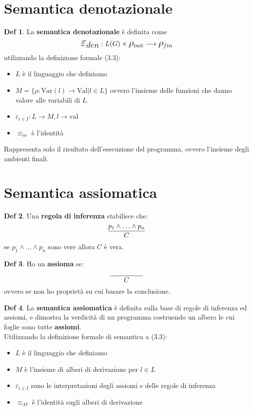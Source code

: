 \documentclass[a4paper]{report}
\theoremstyle{definition} \newtheorem*{defi}{Def}
\theoremstyle{plain} \newtheorem{lemma}{Lemma}
\theoremstyle{plain} \newtheorem{teo}{Teorema}
\theoremstyle{remark} \newtheorem*{es}{Esempio}
\DeclareRobustCommand{\frac}[3][0pt]{%
  {\begingroup\hspace{#1}#2\hspace{#1}\endgroup\over\hspace{#1}#3\hspace{#1}}}
\begin{document}
\section{Semantica denotazionale}
\begin{defi}
	La {\bf semantica denotazionale} è definita come
	$$
	\mathlarger{\mathlarger{\mathlarger{\varepsilon_{den}}}} : L(G) \times \mathlarger{\mathlarger{\rho}}_{init} \longrightarrow \mathlarger{\mathlarger{\rho}}_{fin}
	$$
	utilizzando la definizione formale (3.3):
	\begin{itemize}
		\item $L$ è il linguaggio che definiamo
		\item $M=\{ \rho : \mathrm{Var}(l) \longrightarrow \mathrm{Val} | l \in L \}$ ovvero l'insieme delle funzioni che danno valore alle variabili di $L$.
		\item $\varepsilon_{i\in I} : L\longrightarrow M , l \longrightarrow \mathrm{val}$
		\item $\equiv_m$ è l'identità
	\end{itemize}
\end{defi}
Rappresenta solo il risultato dell'esecuzione del programma, ovvero l'insieme degli ambienti finali.

\section{Semantica assiomatica}
\begin{defi}
	Una {\bf regola di inferenza} stabilisce che:
	$$
	\frac{p_1 \wedge \ldots \wedge p_n}{C}
	$$
	se $ p_1 \wedge \ldots \wedge p_n $ sono vere allora $C$ è vera.
\end{defi}
\begin{defi}
	Ho un {\bf assioma} se:
	$$
	\frac[20pt]{}{C}
	$$
	ovvero se non ho proprietà su cui basare la conclusione.
\end{defi}
\begin{defi}
	La {\bf semantica assiomatica} è definita sulla base di regole di inferenza ed assiomi, e dimostra la verdicità di un programma costruendo un albero le cui foglie sono tutte {\bf assiomi}.
	\\
	Utilizzando la definizione formale di semantica a (3.3):
	\begin{itemize}
		\item $L$ è il linguaggio che definiamo
		\item $M$ è l'insieme di alberi di derivazione per $l\in L$
		\item $\varepsilon_{i\in I}$ sono le interpretazioni degli assiomi e delle regole di inferenza
		\item $\equiv_M$ è l'identità sugli alberi di derivazione
	\end{itemize}
\end{defi}
\end{document}
